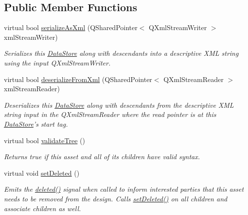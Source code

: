 \subsection*{Public Member Functions}
\begin{DoxyCompactItemize}
\item 
virtual bool \hyperlink{class_picto_1_1_data_store_a691063f5662f5db9c48deabc0f2e972b}{serialize\-As\-Xml} (Q\-Shared\-Pointer$<$ Q\-Xml\-Stream\-Writer $>$ xml\-Stream\-Writer)
\begin{DoxyCompactList}\small\item\em Serializes this \hyperlink{class_picto_1_1_data_store}{Data\-Store} along with descendants into a descriptive X\-M\-L string using the input Q\-Xml\-Stream\-Writer. \end{DoxyCompactList}\item 
virtual bool \hyperlink{class_picto_1_1_data_store_a37bb8f90b4d8c2e12970a276e6a6ec91}{deserialize\-From\-Xml} (Q\-Shared\-Pointer$<$ Q\-Xml\-Stream\-Reader $>$ xml\-Stream\-Reader)
\begin{DoxyCompactList}\small\item\em Deserializes this \hyperlink{class_picto_1_1_data_store}{Data\-Store} along with descendants from the descriptive X\-M\-L string input in the Q\-Xml\-Stream\-Reader where the read pointer is at this \hyperlink{class_picto_1_1_data_store}{Data\-Store}'s start tag. \end{DoxyCompactList}\item 
virtual bool \hyperlink{class_picto_1_1_data_store_a1e5bb3fb88fcfaa2a17920a7457bcbe9}{validate\-Tree} ()
\begin{DoxyCompactList}\small\item\em Returns true if this asset and all of its children have valid syntax. \end{DoxyCompactList}\item 
virtual void \hyperlink{class_picto_1_1_data_store_a114c737439034a916c9ae50c88da27d7}{set\-Deleted} ()
\begin{DoxyCompactList}\small\item\em Emits the \hyperlink{class_picto_1_1_asset_a5a96aa71c14a5de4a24aea183660147a}{deleted()} signal when called to inform interested parties that this asset needs to be removed from the design. Calls \hyperlink{class_picto_1_1_data_store_a114c737439034a916c9ae50c88da27d7}{set\-Deleted()} on all children and associate children as well. \end{DoxyCompactList}\item 

\end{DoxyCompactItemize}
